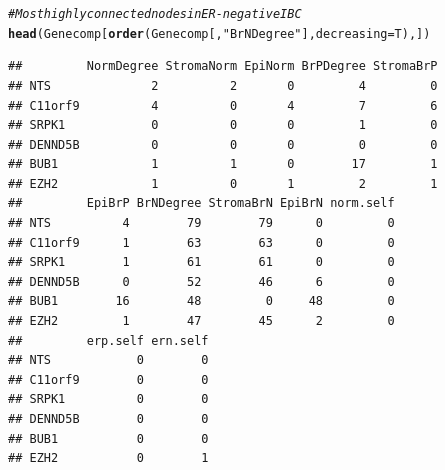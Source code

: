 \documentclass{article}\usepackage[]{graphicx}\usepackage[]{color}
\makeatletter
\newcommand{\hlstr}[1]{\textcolor[rgb]{0.192,0.494,0.8}{#1}}%
\newcommand{\hlcom}[1]{\textcolor[rgb]{0.678,0.584,0.686}{\textit{#1}}}%
\newcommand{\hlstd}[1]{\textcolor[rgb]{0.345,0.345,0.345}{#1}}%
\newcommand{\hlkwc}[1]{\textcolor[rgb]{0.333,0.667,0.333}{#1}}%
\newcommand{\hlkwd}[1]{\textcolor[rgb]{0.737,0.353,0.396}{\textbf{#1}}}%
\newenvironment{kframe}{%
 \def\at@end@of@kframe{}%
 \ifinner\ifhmode%
  \def\at@end@of@kframe{\end{minipage}}%
  \begin{minipage}{\columnwidth}%
 \fi\fi%
 \def\FrameCommand##1{\hskip\@totalleftmargin \hskip-\fboxsep
 \colorbox{shadecolor}{##1}\hskip-\fboxsep
     \hskip-\linewidth \hskip-\@totalleftmargin \hskip\columnwidth}%
 \MakeFramed {\advance\hsize-\width
   \@totalleftmargin\z@ \linewidth\hsize
   \@setminipage}}%
 {\par\unskip\endMakeFramed%
 \at@end@of@kframe}
\newenvironment{knitrout}{}{} %
\makeatother
\begin{document}
\begin{knitrout}
\begin{kframe}
\begin{alltt}
\hlcom{# Most highly connected nodes in ER-negative IBC}
\hlkwd{head}\hlstd{(Genecomp[}\hlkwd{order}\hlstd{(Genecomp[,}\hlstr{"BrNDegree"}\hlstd{],}\hlkwc{decreasing}\hlstd{=T),])}
\end{alltt}
\begin{verbatim}
##         NormDegree StromaNorm EpiNorm BrPDegree StromaBrP
## NTS              2          2       0         4         0
## C11orf9          4          0       4         7         6
## SRPK1            0          0       0         1         0
## DENND5B          0          0       0         0         0
## BUB1             1          1       0        17         1
## EZH2             1          0       1         2         1
##         EpiBrP BrNDegree StromaBrN EpiBrN norm.self
## NTS          4        79        79      0         0
## C11orf9      1        63        63      0         0
## SRPK1        1        61        61      0         0
## DENND5B      0        52        46      6         0
## BUB1        16        48         0     48         0
## EZH2         1        47        45      2         0
##         erp.self ern.self
## NTS            0        0
## C11orf9        0        0
## SRPK1          0        0
## DENND5B        0        0
## BUB1           0        0
## EZH2           0        1
\end{verbatim}
\end{kframe}
\end{knitrout}
\end{document}
